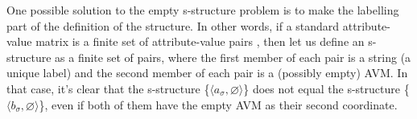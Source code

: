 \documentclass[output=paper,hidelinks]{langscibook}
\begin{document}
% 
One possible solution to the empty s-structure problem is to make the
labelling part of the definition of the structure. In other words, if
a standard attribute-value  matrix is a finite set of attribute-value
pairs \citep[see, e.g.,][44]{BresnanEtAl2016}, then let us define an
s-structure as a finite set of pairs, where the first member of each
pair is a string (a unique label) and the second member of each pair
is a (possibly empty) AVM. In that case, it's clear that the
s-structure \{$\langle a_\sigma, \varnothing \rangle$\} does not equal the
s-structure \{$\langle b_\sigma, \varnothing \rangle$\}, even if both of them
have the empty AVM as their second coordinate. 
\end{document}
